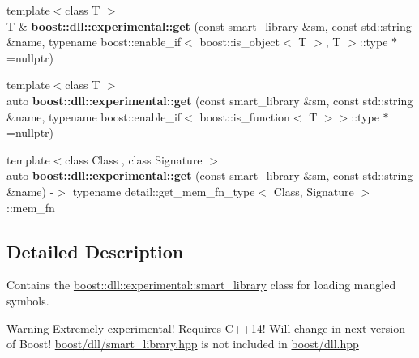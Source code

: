 \begin{DoxyCompactItemize}
\mbox{\label{a00275_ab1927abcb5b6d0ac4bf1559fcfd0e203}} 
{\footnotesize template$<$class T $>$ }\\T \& {\bfseries boost\+::dll\+::experimental\+::get} (const smart\+\_\+library \&sm, const std\+::string \&name, typename boost\+::enable\+\_\+if$<$ boost\+::is\+\_\+object$<$ T $>$, T $>$\+::type $\ast$=nullptr)
\item 
\mbox{\label{a00275_a3d4eee77486ffa45b0efca38762d80d5}} 
{\footnotesize template$<$class T $>$ }\\auto {\bfseries boost\+::dll\+::experimental\+::get} (const smart\+\_\+library \&sm, const std\+::string \&name, typename boost\+::enable\+\_\+if$<$ boost\+::is\+\_\+function$<$ T $>$$>$\+::type $\ast$=nullptr)
\item 
\mbox{\label{a00275_a373e3fa06ec3984c55e7eb38f78fc35c}} 
{\footnotesize template$<$class Class , class Signature $>$ }\\auto {\bfseries boost\+::dll\+::experimental\+::get} (const smart\+\_\+library \&sm, const std\+::string \&name) -\/$>$ typename detail\+::get\+\_\+mem\+\_\+fn\+\_\+type$<$ Class, Signature $>$\+::mem\+\_\+fn
\end{DoxyCompactItemize}


\subsection{Detailed Description}
Contains the \hyperlink{a01712}{boost\+::dll\+::experimental\+::smart\+\_\+library} class for loading mangled symbols. 

\begin{DoxyWarning}{Warning}
Extremely experimental! Requires C++14! Will change in next version of Boost! \hyperlink{a00275}{boost/dll/smart\+\_\+library.\+hpp} is not included in \hyperlink{a00278}{boost/dll.\+hpp} 
\end{DoxyWarning}
